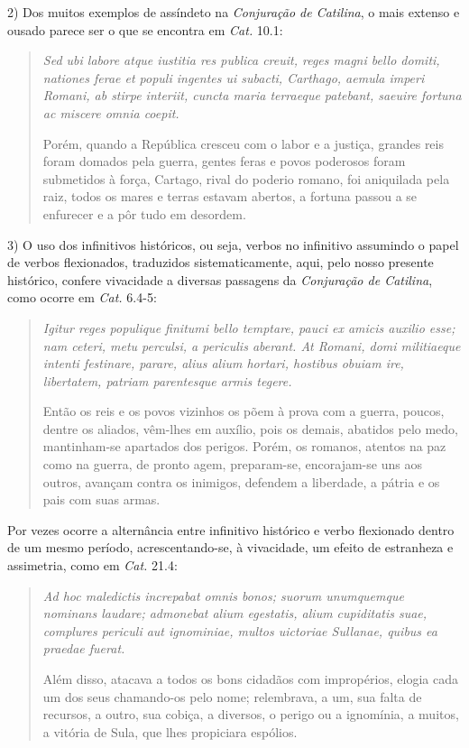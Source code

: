 2) Dos muitos exemplos de assíndeto na \emph{Conjuração de Catilina}, o mais extenso e
ousado parece ser o que se encontra em \emph{Cat.} 10.1: \begin{quote} \emph{Sed ubi
  labore atque iustitia res publica creuit, reges magni bello domiti, nationes
ferae et populi ingentes ui subacti, Carthago, aemula imperi Romani, ab stirpe
interiit, cuncta maria terraeque patebant, saeuire fortuna ac miscere omnia
coepit.}

Porém, quando a República cresceu com o labor e a justiça, grandes reis foram
domados pela guerra, gentes feras e povos poderosos foram submetidos à força,
Cartago, rival do poderio romano, foi aniquilada pela raiz, todos os mares e
terras estavam abertos, a fortuna passou a se enfurecer e a pôr tudo em
desordem.  \end{quote} 


3) O uso dos infinitivos históricos, ou seja, verbos no
infinitivo assumindo o papel de verbos flexionados, traduzidos
sistematicamente, aqui, pelo nosso presente histórico, confere vivacidade a
diversas passagens da \emph{Conjuração de Catilina}, como ocorre em \emph{Cat.} 6.4-5:
\begin{quote} \emph{Igitur reges populique finitumi bello temptare, pauci ex
  amicis auxilio esse; nam ceteri, metu perculsi, a periculis aberant. At
Romani, domi militiaeque intenti festinare, parare, alius alium hortari,
hostibus obuiam ire, libertatem, patriam parentesque armis tegere.}

Então os reis e os povos vizinhos os põem à prova com a guerra, poucos, dentre
os aliados, vêm-lhes em auxílio, pois os demais, abatidos pelo medo,
mantinham-se apartados dos perigos. Porém, os romanos, atentos na paz como
na guerra, de pronto agem, preparam-se, encorajam-se uns aos outros, avançam
contra os inimigos, defendem a liberdade, a pátria e os pais com suas armas.
\end{quote} 


Por vezes ocorre a alternância entre infinitivo histórico e verbo
flexionado dentro de um mesmo período, acrescentando-se, à vivacidade, um
efeito de estranheza e assimetria, como em \emph{Cat.} 21.4: \begin{quote} \emph{Ad hoc
  maledictis increpabat omnis bonos; suorum unumquemque nominans laudare;
admonebat alium egestatis, alium cupiditatis suae, complures periculi aut
ignominiae, multos uictoriae Sullanae, quibus ea praedae fuerat.} 

Além disso,
atacava a todos os bons cidadãos com impropérios, elogia cada um dos seus
chamando-os pelo nome; relembrava, a um, sua falta de recursos, a outro, sua
cobiça, a diversos, o perigo ou a ignomínia, a muitos, a vitória de Sula, que
lhes propiciara espólios.  \end{quote} 


